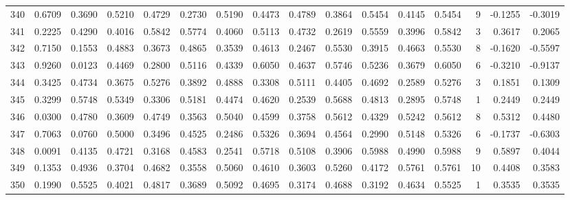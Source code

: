 \begin{tabular}{lrrrrrrrrrrrrrrr}
340 &      0.6709 &  0.3690 &  0.5210 &  0.4729 &  0.2730 &  0.5190 &  0.4473 &  0.4789 &  0.3864 &  0.5454 &   0.4145 &     0.5454 &      9 &                   -0.1255 &                    -0.3019 \\
341 &      0.2225 &  0.4290 &  0.4016 &  0.5842 &  0.5774 &  0.4060 &  0.5113 &  0.4732 &  0.2619 &  0.5559 &   0.3996 &     0.5842 &      3 &                    0.3617 &                     0.2065 \\
342 &      0.7150 &  0.1553 &  0.4883 &  0.3673 &  0.4865 &  0.3539 &  0.4613 &  0.2467 &  0.5530 &  0.3915 &   0.4663 &     0.5530 &      8 &                   -0.1620 &                    -0.5597 \\
343 &      0.9260 &  0.0123 &  0.4469 &  0.2800 &  0.5116 &  0.4339 &  0.6050 &  0.4637 &  0.5746 &  0.5236 &   0.3679 &     0.6050 &      6 &                   -0.3210 &                    -0.9137 \\
344 &      0.3425 &  0.4734 &  0.3675 &  0.5276 &  0.3892 &  0.4888 &  0.3308 &  0.5111 &  0.4405 &  0.4692 &   0.2589 &     0.5276 &      3 &                    0.1851 &                     0.1309 \\
345 &      0.3299 &  0.5748 &  0.5349 &  0.3306 &  0.5181 &  0.4474 &  0.4620 &  0.2539 &  0.5688 &  0.4813 &   0.2895 &     0.5748 &      1 &                    0.2449 &                     0.2449 \\
346 &      0.0300 &  0.4780 &  0.3609 &  0.4749 &  0.3563 &  0.5040 &  0.4599 &  0.3758 &  0.5612 &  0.4329 &   0.5242 &     0.5612 &      8 &                    0.5312 &                     0.4480 \\
347 &      0.7063 &  0.0760 &  0.5000 &  0.3496 &  0.4525 &  0.2486 &  0.5326 &  0.3694 &  0.4564 &  0.2990 &   0.5148 &     0.5326 &      6 &                   -0.1737 &                    -0.6303 \\
348 &      0.0091 &  0.4135 &  0.4721 &  0.3168 &  0.4583 &  0.2541 &  0.5718 &  0.5108 &  0.3906 &  0.5988 &   0.4990 &     0.5988 &      9 &                    0.5897 &                     0.4044 \\
349 &      0.1353 &  0.4936 &  0.3704 &  0.4682 &  0.3558 &  0.5060 &  0.4610 &  0.3603 &  0.5260 &  0.4172 &   0.5761 &     0.5761 &     10 &                    0.4408 &                     0.3583 \\
350 &      0.1990 &  0.5525 &  0.4021 &  0.4817 &  0.3689 &  0.5092 &  0.4695 &  0.3174 &  0.4688 &  0.3192 &   0.4634 &     0.5525 &      1 &                    0.3535 &                     0.3535 \\

\end{tabular}
